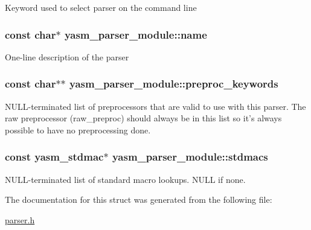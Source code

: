 Keyword used to select parser on the command line \hypertarget{structyasm__parser__module_aa8c8365a65281bb5176d1132112face5}{
\subsubsection[{name}]{\setlength{\rightskip}{0pt plus 5cm}const char$\ast$ yasm\-\_\-parser\-\_\-module\-::name}}\label{structyasm__parser__module_aa8c8365a65281bb5176d1132112face5}
One-\/line description of the parser \hypertarget{structyasm__parser__module_a6c6c5f67b090162a47bc914e0e1aa90d}{
\subsubsection[{preproc\-\_\-keywords}]{\setlength{\rightskip}{0pt plus 5cm}const char$\ast$$\ast$ yasm\-\_\-parser\-\_\-module\-::preproc\-\_\-keywords}}\label{structyasm__parser__module_a6c6c5f67b090162a47bc914e0e1aa90d}
N\-U\-L\-L-\/terminated list of preprocessors that are valid to use with this parser. The raw preprocessor (raw\-\_\-preproc) should always be in this list so it's always possible to have no preprocessing done. \hypertarget{structyasm__parser__module_a6fc03a541552e7182b3027bd559e16f0}{
\subsubsection[{stdmacs}]{\setlength{\rightskip}{0pt plus 5cm}const {\bf yasm\-\_\-stdmac}$\ast$ yasm\-\_\-parser\-\_\-module\-::stdmacs}}\label{structyasm__parser__module_a6fc03a541552e7182b3027bd559e16f0}
N\-U\-L\-L-\/terminated list of standard macro lookups. N\-U\-L\-L if none. 

The documentation for this struct was generated from the following file\-:\begin{DoxyCompactItemize}
\item 
\hyperlink{parser_8h}{parser.\-h}\end{DoxyCompactItemize}

